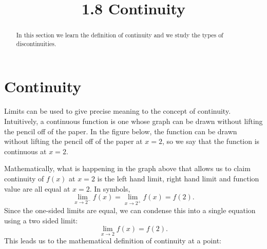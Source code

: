 \documentclass[handout]{ximera}
\title{1.8 Continuity}
\begin{document}
\begin{abstract}
In this section we learn the definition of continuity and we study the types of discontinuities.
\end{abstract}

\maketitle






\section{Continuity}

Limits can be used to give precise meaning to the concept of continuity. Intuitively, a continuous function is one whose graph can be drawn
without lifting the pencil off of the paper. In the figure below, the function can be drawn without lifting the pencil 
off of the paper at $x = 2$, so we say that the function is continuous at $x = 2$.

\begin{image}
\end{image}
Mathematically, what is happening in the graph above that allows us to claim continuity of $f(x)$ at $x = 2$ 
is the left hand limit, right hand limit and function value are all equal at $x = 2$.
In symbols,
\[
\lim_{x\to 2^-} f(x) = \lim_{x\to 2^+} f(x) = f(2).
\]
Since the one-sided limits are equal, we can condense this into a single equation using a two sided limit:
\[
\lim_{x\to 2} f(x) = f(2).
\]
This leads us to the mathematical definition of continuity at a point:
\end{document}

